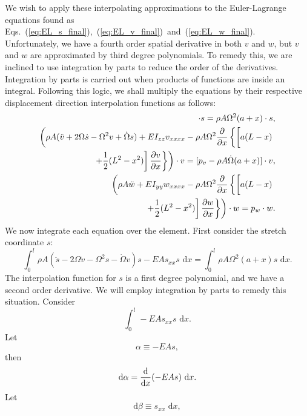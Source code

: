We wish to apply these interpolating approximations to the Euler-Lagrange equations found as Eqs.~(\ref{eq:EL_s_final}),~(\ref{eq:EL_v_final})~and~(\ref{eq:EL_w_final}). Unfortunately, we have a fourth order spatial derivative in both $v$ and $w$, but $v$ and $w$ are approximated by third degree polynomials. To remedy this, we are inclined to use integration by parts to reduce the order of the derivatives. Integration by parts is carried out when products of functions are inside an integral. Following this logic, we shall multiply the equations by their respective displacement direction interpolation functions as follows:
\begin{eqnarray}
[\rho A(\ddot s - 2\Omega\dot v-\Omega^2s-\dot\Omega v)-EAs_{xx}]\cdot s = \rho A\Omega^2(a+x)\cdot s, \\
\left(\rho A(\ddot v + 2\Omega\dot s-\Omega^2v+\dot\Omega s)+EI_{zz}v_{xxxx}-\rho A\Omega^2\frac{\partial}{\partial x}\left\lbrace\left[a(L-x)\vphantom{\frac{0}{0}}\right.\right.\right.\\
\left.\left.\left.+\frac{1}{2}(L^2-x^2)\right]\frac{\partial v}{\partial x}\right\rbrace\right)\cdot v = [p_v - \rho A\dot\Omega(a+x)]\cdot v, \nonumber \\
\left(\rho A\ddot w+EI_{yy}w_{xxxx}-\rho A\Omega^2\frac{\partial}{\partial x}\left\lbrace\left[a(L-x)\vphantom{\frac{0}{0}}\right.\right.\right.\\
\left.\left.\left.+\frac{1}{2}(L^2-x^2)\right]\frac{\partial w}{\partial x}\right\rbrace\right)\cdot w = p_w\cdot w. \nonumber
\end{eqnarray}
We now integrate each equation over the element. First consider the stretch coordinate $s$:
\begin{equation}
\int_0^l \rho A(\ddot s-2\Omega\dot v-\Omega^2s-\dot\Omega v)s-EAs_{xx}s \text{ d}x = \int_0^l \rho A\Omega^2(a+x)s\text{ d}x.
\end{equation}
The interpolation function for $s$ is a first degree polynomial, and we have a second order derivative. We will employ integration by parts to remedy this situation.
Consider
\begin{equation}
\int_0^l -EAs_{xx}s\text{ d}x. 
\end{equation}
Let
\begin{equation}
\alpha \equiv -EAs,
\end{equation}
then
\begin{equation}
\text d\alpha = \frac{\text d}{\text dx}(-EAs)\text{ d}x.
\end{equation}
Let
\begin{equation}
\text{d}\beta \equiv s_{xx}\text{ d}x,
\end{equation}
